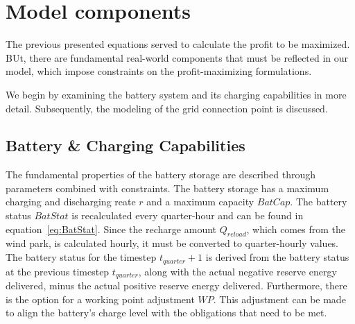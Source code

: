 
\section{Model components}
\label{chap:model_components}
The previous presented equations served to calculate the profit to be maximized.
BUt, there are fundamental real-world components that must be reflected in our model,
which impose constraints on the profit-maximizing formulations.

We begin by examining the battery system and its charging capabilities in more detail.
Subsequently, the modeling of the grid connection point is discussed.

\subsection{Battery \& Charging Capabilities}
The fundamental properties of the battery storage are described through parameters combined with constraints.
The battery storage has a maximum charging and discharging reate $r$ and a maximum capacity $BatCap$.
The battery status $BatStat$ is recalculated every quarter-hour and can be found in equation~\ref{eq:BatStat}.
Since the recharge amount $Q_{reload}$, which comes from the wind park, is calculated hourly,
it must be converted to quarter-hourly values. The battery status for the timestep $t_{quarter} + 1$
is derived from the battery status at the previous timestep $t_{quarter}$, along with the actual negative reserve energy delivered,
minus the actual positive reserve energy delivered. Furthermore, there is the option for a working point adjustment $WP$.
This adjustment can be made to align the battery's charge level with the obligations that need to be met.

